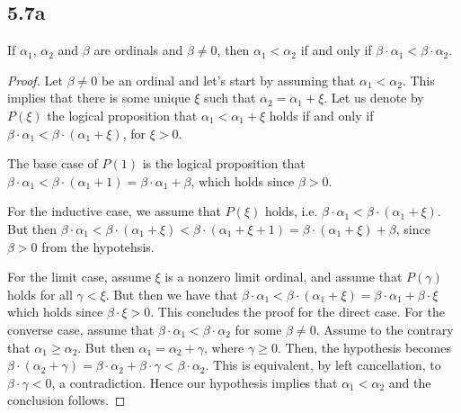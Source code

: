 \subsection*{5.7a} If $\alpha_1$, $\alpha_2$ and $\beta$ are ordinals and $\beta \neq 0$, then $\alpha_1 < \alpha_2$ if and only if $\beta \cdot \alpha_1 < \beta \cdot \alpha_2$.

\begin{proof}
    Let $\beta \neq 0$ be an ordinal and let's start by assuming that $\alpha_1 < \alpha_2$. This implies that there is some unique $\xi$ such that $\alpha_2 = \alpha_1 + \xi$. Let us denote by $P(\xi)$ the logical proposition that $\alpha_1 < \alpha_1 + \xi$ holds if and only if $\beta \cdot \alpha_1 < \beta \cdot (\alpha_1 + \xi)$, for $\xi > 0$.

    The base case of $P(1)$ is the logical proposition that $\beta \cdot \alpha_1 < \beta \cdot (\alpha_1 + 1) = \beta \cdot \alpha_1 + \beta$, which holds since $\beta > 0$. 

    For the inductive case, we assume that $P(\xi)$ holds, i.e. $\beta \cdot \alpha_1 < \beta \cdot (\alpha_1 + \xi)$. But then $\beta \cdot \alpha_1 < \beta \cdot (\alpha_1 + \xi) < \beta \cdot (\alpha_1 + \xi+1) = \beta \cdot (\alpha_1 + \xi) + \beta$, since $\beta > 0$ from the hypotehsis.

    For the limit case, assume $\xi$ is a nonzero limit ordinal, and assume that $P(\gamma)$ holds for all $\gamma < \xi$. But then we have that $\beta \cdot \alpha_1 < \beta \cdot (\alpha_1 + \xi) = \beta \cdot \alpha_1 + \beta \cdot \xi$ which holds since $\beta \cdot \xi > 0$.
    \vspace{1em}
    This concludes the proof for the direct case. For the converse case, assume that $\beta \cdot \alpha_1 < \beta \cdot \alpha_2$ for some $\beta \neq 0$. Assume to the contrary that $\alpha_1 \geq \alpha_2$. But then $\alpha_1 = \alpha_2 + \gamma$, where $\gamma \geq 0$. Then, the hypothesis becomes $\beta \cdot (\alpha_2 + \gamma) = \beta \cdot \alpha_2 + \beta \cdot \gamma < \beta \cdot \alpha_2$. This is equivalent, by left cancellation, to $\beta \cdot \gamma < 0$, a contradiction. Hence our hypothesis implies that $\alpha_1 < \alpha_2$ and the conclusion follows.
    
\end{proof}

